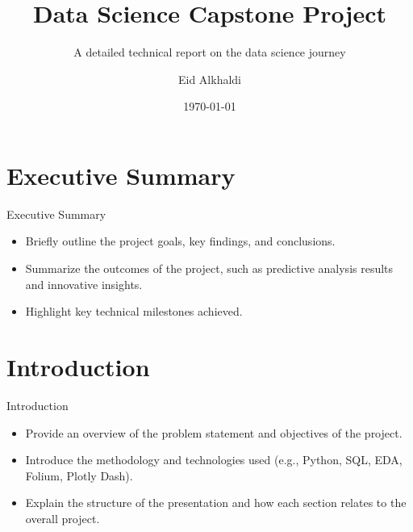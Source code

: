 \documentclass{beamer}
\title[Capstone Project]{Data Science Capstone Project}
\subtitle{A detailed technical report on the data science journey}
\author{Eid Alkhaldi}
\date{\today}
\begin{document}
\begin{frame}
    \titlepage
\end{frame}

\section{Executive Summary}
\begin{frame}{Executive Summary}
    \begin{itemize}
        \item Briefly outline the project goals, key findings, and conclusions.
        \item Summarize the outcomes of the project, such as predictive analysis results and innovative insights.
        \item Highlight key technical milestones achieved.
    \end{itemize}
\end{frame}

\section{Introduction}
\begin{frame}{Introduction}
    \begin{itemize}
        \item Provide an overview of the problem statement and objectives of the project.
        \item Introduce the methodology and technologies used (e.g., Python, SQL, EDA, Folium, Plotly Dash).
        \item Explain the structure of the presentation and how each section relates to the overall project.
    \end{itemize}
\end{frame}

\end{document}
